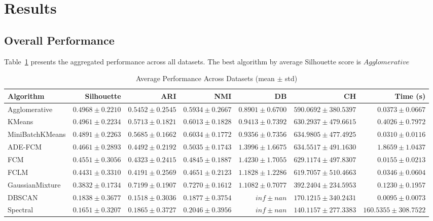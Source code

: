 \documentclass[11pt,a4paper]{article}
\begin{document}
\section{Results}
\subsection{Overall Performance}
Table~\ref{tab:benchmark_avg} presents the aggregated performance across all
datasets. The best algorithm by average Silhouette score is
\ensuremath{Agglomerative}

\begin{table}[htbp]
\centering
\caption{Average Performance Across Datasets (mean $\pm$ std)}
\label{tab:benchmark_avg}
\small
\begin{tabular}{lrrrrrr}
\toprule
Algorithm & Silhouette & ARI & NMI & DB & CH & Time (s) \\
\midrule
Agglomerative & $0.4968 \pm 0.2210$ & $0.5452 \pm 0.2545$ & $0.5934 \pm 0.2667$ & $0.8901 \pm 0.6700$ & $590.0692 \pm 380.5397$ & $0.0373 \pm 0.0667$ \\
KMeans & $0.4961 \pm 0.2234$ & $0.5713 \pm 0.1821$ & $0.6013 \pm 0.1828$ & $0.9413 \pm 0.7392$ & $630.2937 \pm 479.6615$ & $0.4026 \pm 0.7972$ \\
MiniBatchKMeans & $0.4891 \pm 0.2263$ & $0.5685 \pm 0.1662$ & $0.6034 \pm 0.1772$ & $0.9356 \pm 0.7356$ & $634.9805 \pm 477.4925$ & $0.0310 \pm 0.0116$ \\
ADE-FCM & $0.4661 \pm 0.2893$ & $0.4492 \pm 0.2192$ & $0.5035 \pm 0.1743$ & $1.3996 \pm 1.6675$ & $634.5517 \pm 491.1630$ & $1.8659 \pm 1.0437$ \\
FCM & $0.4551 \pm 0.3056$ & $0.4323 \pm 0.2415$ & $0.4845 \pm 0.1887$ & $1.4230 \pm 1.7055$ & $629.1174 \pm 497.8307$ & $0.0155 \pm 0.0213$ \\
FCLM & $0.4431 \pm 0.3310$ & $0.4191 \pm 0.2569$ & $0.4651 \pm 0.2123$ & $1.1828 \pm 1.2286$ & $619.7057 \pm 510.4663$ & $0.0346 \pm 0.0604$ \\
GaussianMixture & $0.3832 \pm 0.1734$ & $0.7199 \pm 0.1907$ & $0.7270 \pm 0.1612$ & $1.1082 \pm 0.7077$ & $392.2404 \pm 234.5953$ & $0.1230 \pm 0.1957$ \\
DBSCAN & $0.1838 \pm 0.3677$ & $0.1518 \pm 0.3036$ & $0.1877 \pm 0.3754$ & $inf \pm nan$ & $170.1215 \pm 340.2431$ & $0.0095 \pm 0.0073$ \\
Spectral & $0.1651 \pm 0.3207$ & $0.1865 \pm 0.3727$ & $0.2046 \pm 0.3956$ & $inf \pm nan$ & $140.1157 \pm 277.3383$ & $160.5355 \pm 308.7522$ \\
\bottomrule
\end{tabular}
\end{table}
\end{document}

